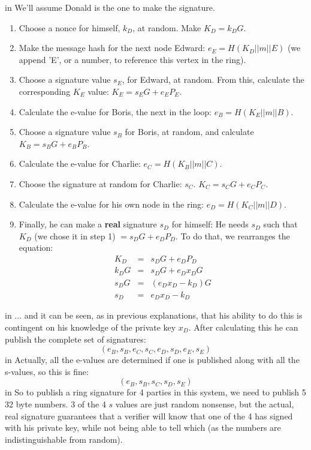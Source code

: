 \documentclass[10pt,a4paper]{article}
\begin{document}
 in \noindent We'll assume Donald is the one to make the signature.

\begin{enumerate}
\item Choose a nonce for himself, $k_D$, at random. Make $K_D = k_{D}G$.
\item Make the message hash for the next node Edward: $e_E = H(K_D||m||E)$ (we append 'E', or a number, to reference this vertex in the ring).
\item Choose a signature value $s_E$, for Edward, at random. From this, calculate the corresponding $K_E$ value: $K_E = s_{E}G +e_{E}P_{E}$.
\item Calculate the e-value for Boris, the next in the loop: $e_B = H(K_E || m || B)$.
\item Choose a signature value $s_B$ for Boris, at random, and calculate $K_B = s_{B}G + e_{B}P_{B}$.
\item Calculate the e-value for Charlie: $e_C = H(K_B || m || C)$.
\item Choose the signature at random for Charlie: $s_C$. $K_C = s_{C}G + e_{C}P_{C}$.
\item Calculate the e-value for his own node in the ring: $e_D = H(K_C || m || D)$.
\item Finally, he can make a \textbf{real} signature $s_D$ for himself: He needs $s_D$ such that $K_D$ (we chose it in step 1) $= s_{D}G + e_{D}P_{D}$. To do that, we rearranges the equation:
\begin{eqnarray*}
K_D &=& s_{D}G + e_{D}P_D \\
k_{D}G &=& s_{D}G + e_{D}x_{D}G \\
s_{D}G &=& \left(e_{D}x_{D} - k_{D}\right)G \\
s_D &=& e_{D}x_{D} - k_D
\end{eqnarray*}
\end{enumerate}

 in \noindent ... and it can be seen, as in previous explanations, that his ability to do this is contingent on his knowledge of the private key $x_D$. After calculating this he can publish the complete set of signatures:
\[ (e_B, s_B, e_C, s_C, e_D, s_D, e_E, s_E) \]
 in \noindent Actually, all the e-values are determined if one is published along with all the s-values, so this is fine:
\[(e_B, s_B, s_C, s_D, s_E)\]
 in \noindent So to publish a ring signature for 4 parties in this system, we need to publish 5 32 byte numbers. 3 of the 4 $s$ values are just random nonsense, but the actual, real signature guarantees that a verifier will know that one of the 4 has signed with his private key, while not being able to tell which (as the numbers are indistinguishable from random).
\end{document}
